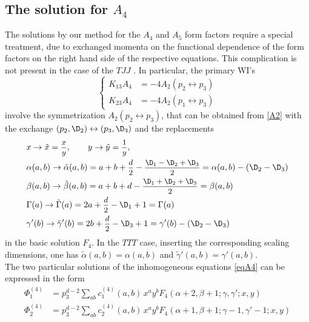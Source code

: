 \documentclass[a4paper,11pt,openright,twoside]{book}
\let\a=\alpha   \let\b=\beta   \let\g=\gamma   \let\d=\delta
\newcommand{\sdfrac}[2]{\mbox{\small$\displaystyle\frac{#1}{#2}$}}
\numberwithin{equation}{section}
\begin{document}
{{\subsection{The solution for $A_4$}\label{A4section}
The solutions by our method for the $A_4$ and $A_5$ form factors require a special treatment, due to exchanged momenta on the functional dependence of the form factors on the right hand side of the respective equations. This complication is not present in the case of the $TJJ$ \cite{Coriano:2018bbe}.
In particular, the primary WI's
\begin{equation}
\left\{\begin{split}
	K_{13} A_4 &=-4 A_2(p_2\leftrightarrow p_3)\\
	K_{23} A_4&=-4 A_2 (p_1\leftrightarrow p_3)
\end{split}
\right.\label{eqA4}
\end{equation}
involve the symmetrization $A_2(p_2\leftrightarrow p_3)$, that can be obtained from \eqref{A2} with the exchange $(p_2,\D_2)\leftrightarrow (p_3,\D_3)$ and the replacements
\begin{equation}
\begin{split}
	&x\to \tilde x=\sdfrac{x}{y},\qquad y\to \tilde y=\sdfrac{1}{y},\\
	&\a(a,b)\to \tilde{\a}(a,b)=a+b+\sdfrac{d}{2}-\sdfrac{\D_1-\D_2+\D_3}{2}=\a(a,b)-(\D_2-\D_3)\\
	&\b(a,b)\to \tilde\b(a,b)=a+b+d-\sdfrac{\D_1+\D_2+\D_3}{2}=\b(a,b)\\
	&\Gamma(a)\to \tilde\Gamma(a)=2a+\sdfrac{d}{2}-\D_1+1=\Gamma(a)\\
	&\g'(b)\to \tilde\g'(b)=2b+\sdfrac{d}{2}-\D_3+1=\g'(b)-(\D_2-\D_3)\\
\end{split}
\end{equation}
in the basic solution $F_4$. In the $TTT$ case, inserting the corresponding scaling dimensions, one has $\tilde\a(a,b)=\a(a,b)$ and $\tilde\g'(a,b)=\g'(a,b)$. \\
The two particular solutions of the inhomogeneous equations \eqref{eqA4} can be expressed in the form
\begin{equation}
\begin{split}
	\Phi_1^{(4)}&=p_3^{d -2} \sum_{a b} c_1^{(4)}(a,b)\, x^a y^b   F_4(\alpha+2,\beta+1; \gamma,\gamma';x,y)\\
	\Phi_2^{(4)}&=p_3^{d -2} \sum_{a b} c_2^{(4)}(a,b)\, x^a y^b   F_4(\alpha+1,\beta+1; \gamma-1,\gamma'-1;x,y)

\end{split}
\end{equation}}}
\end{document}
